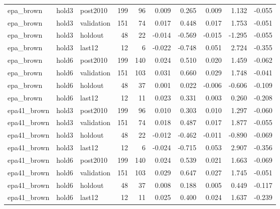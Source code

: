 \begin{table}
\begin{tabular}{lllrrrrrrr}
epa\_brown & hold3 & post2010 & 199 & 96 & 0.009 & 0.265 & 0.009 & 1.132 & -0.055 \\
epa\_brown & hold3 & validation & 151 & 74 & 0.017 & 0.448 & 0.017 & 1.753 & -0.051 \\
epa\_brown & hold3 & holdout & 48 & 22 & -0.014 & -0.569 & -0.015 & -1.295 & -0.055 \\
epa\_brown & hold3 & last12 & 12 & 6 & -0.022 & -0.748 & 0.051 & 2.724 & -0.355 \\
epa\_brown & hold6 & post2010 & 199 & 140 & 0.024 & 0.510 & 0.020 & 1.459 & -0.062 \\
epa\_brown & hold6 & validation & 151 & 103 & 0.031 & 0.660 & 0.029 & 1.748 & -0.041 \\
epa\_brown & hold6 & holdout & 48 & 37 & 0.001 & 0.022 & -0.006 & -0.606 & -0.109 \\
epa\_brown & hold6 & last12 & 12 & 11 & 0.023 & 0.331 & 0.003 & 0.260 & -0.208 \\
epa41\_brown & hold3 & post2010 & 199 & 96 & 0.010 & 0.303 & 0.010 & 1.297 & -0.060 \\
epa41\_brown & hold3 & validation & 151 & 74 & 0.018 & 0.487 & 0.017 & 1.877 & -0.055 \\
epa41\_brown & hold3 & holdout & 48 & 22 & -0.012 & -0.462 & -0.011 & -0.890 & -0.069 \\
epa41\_brown & hold3 & last12 & 12 & 6 & -0.024 & -0.715 & 0.053 & 2.907 & -0.356 \\
epa41\_brown & hold6 & post2010 & 199 & 140 & 0.024 & 0.539 & 0.021 & 1.663 & -0.069 \\
epa41\_brown & hold6 & validation & 151 & 103 & 0.029 & 0.647 & 0.027 & 1.745 & -0.051 \\
epa41\_brown & hold6 & holdout & 48 & 37 & 0.008 & 0.188 & 0.005 & 0.449 & -0.117 \\
epa41\_brown & hold6 & last12 & 12 & 11 & 0.025 & 0.400 & 0.024 & 1.637 & -0.239 \\
\bottomrule
\end{tabular}
\end{table}

